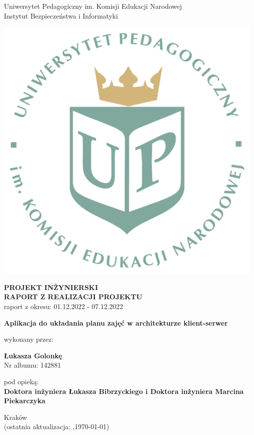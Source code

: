 \documentclass[12pt,a4paper,oneside]{article}
\theoremstyle{definition}
\numberwithin{equation}{section}
\begin{document}

\thispagestyle{empty}
\begin{titlepage}
\begin{center}\Large
Uniwersytet Pedagogiczny im. Komisji Edukacji Narodowej \\
\large
Instytut Bezpieczeństwa i Informatyki\\
\vskip 10pt
\end{center}
\begin{center}
\centering \includegraphics[width=0.4\columnwidth]{../resources/images/logoUP_pl.pdf}
\end{center}

\begin{center}
 {\bf \fontsize{14pt}{14pt}\selectfont PROJEKT INŻYNIERSKI \\ RAPORT Z REALIZACJI PROJEKTU\\
 }
 {\fontsize{12pt}{12pt} raport z okresu: 01.12.2022 - 07.12.2022}
\end{center}
\vskip 5pt
\begin{center}
 {\bf \fontsize{22pt}{22pt}\selectfont Aplikacja do układania planu zajęć w architekturze klient-serwer}
\end{center}

\begin{center}
 {\fontsize{12pt}{12pt}\selectfont wykonany przez: }
\end{center}
\begin{center}
 {\bf\fontsize{16pt}{16pt}\selectfont Łukasza Golonkę}\\
 {\fontsize{12pt}{12pt}\selectfont Nr albumu: 142881 \\}
\end{center}
\begin{center}
 {\fontsize{12pt}{12pt}\selectfont pod opieką:}\\
 {\bf\fontsize{12pt}{12pt}\selectfont Doktora inżyniera Łukasza Bibrzyckiego i Doktora inżyniera Marcina Piekarczyka}
\end{center}

\vspace*{\fill}
\begin{center}
\large
Kraków \the\year\\
(ostatnia aktualizacja: \DTMcurrenttime,\;\today)
\end{center}
\end{titlepage}
\setcounter{page}{0} 
\newpage\null\thispagestyle{empty}
\end{document}
